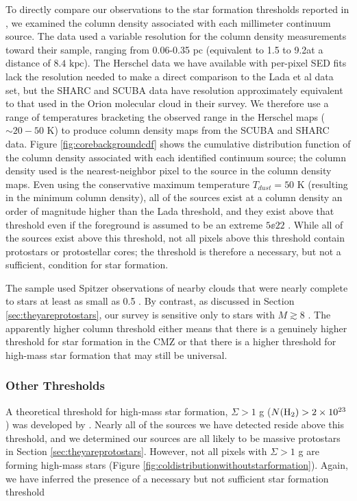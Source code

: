 \documentclass[twocolumn]{aastex61}
\newcommand{\dsgrb}{\ensuremath{8.4\textrm{~kpc}}\xspace}
\begin{document}
To directly compare our observations to the star formation thresholds reported
in \citet{Lada2010a}, we examined the column density associated with each
millimeter continuum source.  The \citet{Lada2010a} data used a variable
resolution for the column density measurements toward their sample, ranging from
0.06-0.35 pc (equivalent to 1.5 to 9.2\arcsec at a distance of \dsgrb).  The
Herschel data we have available with per-pixel SED fits lack the resolution
needed to make a direct comparison to the Lada et al data set, but the SHARC
and SCUBA data have resolution approximately equivalent to that used in the
Orion molecular cloud in their survey.  We therefore use a range of temperatures
bracketing the observed range in the Herschel maps ($\sim20-50$ K) to produce
column density maps from the SCUBA and SHARC data.  Figure
\ref{fig:corebackgroundcdf} shows the cumulative distribution function of the
column density associated with each identified continuum source; the column
density used is the nearest-neighbor pixel to the source in the column density
maps.  Even using the conservative maximum temperature $T_{dust}=50$ K
(resulting in the minimum column density), all of the sources exist at a column
density an order of magnitude higher than the Lada threshold, and they exist
above that threshold even if the foreground is assumed to be an extreme $5\ee{22}$
\persc.  While all of the sources exist above this threshold, not all pixels
above this threshold contain protostars or protostellar cores; the threshold
is therefore a necessary, but not a sufficient, condition for star formation.


The \citet{Lada2010a} sample used Spitzer observations of nearby clouds that
were nearly complete to stars at least as small as 0.5 \msun.  By contrast, as
discussed in Section \ref{sec:theyareprotostars}, our survey is sensitive only
to stars with $M\gtrsim8$ \msun.  The apparently higher column threshold either
means that there is a genuinely higher threshold for star formation in the CMZ
or that there is a higher threshold for high-mass star formation that may still
be universal.  

\subsubsection{Other Thresholds}

A theoretical threshold for high-mass star formation, $\Sigma > 1$ g \persc ($N(\textrm{H}_{2})
> 2\times10^{23}$ \persc) was developed by \citet{Krumholz2008a}.   Nearly all of the
sources we have detected reside above this threshold, and we determined our
sources are all likely to be massive protostars in Section
\ref{sec:theyareprotostars}.  However, not all pixels with $\Sigma > 1$ g \persc are
forming high-mass stars (Figure \ref{fig:coldistributionwithoutstarformation}).
Again, we have inferred the presence of a necessary but not sufficient star
formation threshold
\end{document}
